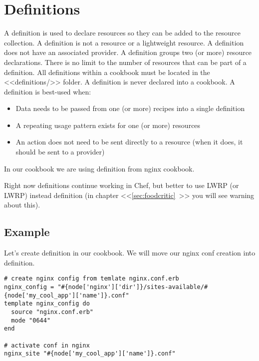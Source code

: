 \section{Definitions}

A definition is used to declare resources so they can be added to the resource collection. A definition is not a resource or a lightweight resource. A definition does not have an associated provider. A definition groups two (or more) resource declarations. There is no limit to the number of resources that can be part of a definition. All definitions within a cookbook must be located in the <<definitions/>> folder. A definition is never declared into a cookbook. A definition is best-used when:

\begin{itemize}
  \item Data needs to be passed from one (or more) recipes into a single definition
  \item A repeating usage pattern exists for one (or more) resources
  \item An action does not need to be sent directly to a resource (when it does, it should be sent to a provider)
\end{itemize}

In our  cookbook we are using  definition from nginx cookbook.

Right now definitions continue working in Chef, but better to use LWRP (or LWRP) instead definition (in chapter <<\ref{sec:foodcritic}~>> you will see warning about this).

\subsection{Example}

Let's create definition in our  cookbook. We will move our nginx conf creation into definition.

\begin{lstlisting}[label=lst:cookbook-definitions-default1,title=my-server-cloud/site-cookbooks/my\_cool\_app/recipes/default.rb]
# create nginx config from temlate nginx.conf.erb
nginx_config = "#{node['nginx']['dir']}/sites-available/#{node['my_cool_app']['name']}.conf"
template nginx_config do
  source "nginx.conf.erb"
  mode "0644"
end

# activate conf in nginx
nginx_site "#{node['my_cool_app']['name']}.conf"
\end{lstlisting}

